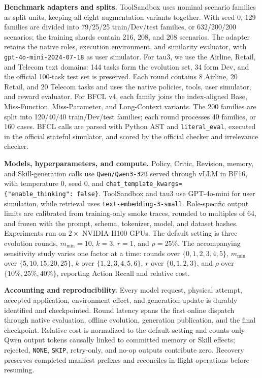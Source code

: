 \textbf{Benchmark adapters and splits.} ToolSandbox uses nominal scenario families as split units, keeping all eight augmentation variants together. With seed 0, 129 families are divided into 79/25/25 train/Dev/test families, or 632/200/200 scenarios; the training shards contain 216, 208, and 208 scenarios. The adapter retains the native roles, execution environment, and similarity evaluator, with \texttt{gpt-4o-mini-2024-07-18} as user simulator. For tau3, we use the Airline, Retail, and Telecom text domains: 144 tasks form the evolution set, 34 form Dev, and the official 100-task test set is preserved. Each round contains 8 Airline, 20 Retail, and 20 Telecom tasks and uses the native policies, tools, user simulator, and reward evaluator. For BFCL v4, each family joins the index-aligned Base, Miss-Function, Miss-Parameter, and Long-Context variants. The 200 families are split into 120/40/40 train/Dev/test families; each round processes 40 families, or 160 cases. BFCL calls are parsed with Python AST and \texttt{literal\_eval}, executed in the official stateful simulator, and scored by the official checker and irrelevance checker.

\textbf{Models, hyperparameters, and compute.} Policy, Critic, Revision, memory, and Skill-generation calls use \texttt{Qwen/Qwen3-32B} served through vLLM in BF16, with temperature 0, seed 0, and \texttt{chat\_template\_kwargs=\{"enable\_thinking":\ false\}}. ToolSandbox and tau3 use GPT-4o-mini for user simulation, while retrieval uses \texttt{text-embedding-3-small}. Role-specific output limits are calibrated from training-only smoke traces, rounded to multiples of 64, and frozen with the prompt, schema, tokenizer, model, and dataset hashes. Experiments run on \(2\times\) NVIDIA H100 GPUs. The default setting is three evolution rounds, \(m_{\min}=10\), \(k=3\), \(r=1\), and \(\rho=25\%\). The accompanying sensitivity study varies one factor at a time: rounds over \(\{0,1,2,3,4,5\}\), \(m_{\min}\) over \(\{5,10,15,20,25\}\), \(k\) over \(\{1,2,3,4,5,6\}\), \(r\) over \(\{0,1,2,3\}\), and \(\rho\) over \(\{10\%,25\%,40\%\}\), reporting Action Recall and relative cost.

\textbf{Accounting and reproducibility.} Every model request, physical attempt, accepted application, environment effect, and generation update is durably identified and checkpointed. Round latency spans the first online dispatch through native evaluation, offline evolution, generation publication, and the final checkpoint. Relative cost is normalized to the default setting and counts only Qwen output tokens causally linked to committed memory or Skill effects; rejected, \texttt{NONE}, \texttt{SKIP}, retry-only, and no-op outputs contribute zero. Recovery preserves completed manifest prefixes and reconciles in-flight operations before resuming.
